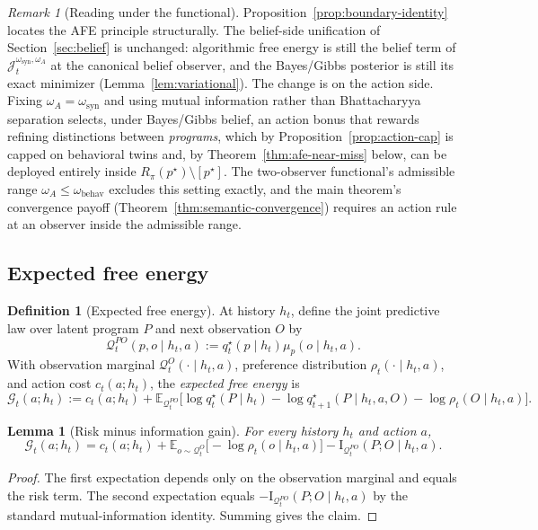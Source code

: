 \documentclass[11pt]{article}
\newtheorem{lemma}[theorem]{Lemma}
\theoremstyle{definition}
\newtheorem{definition}[theorem]{Definition}
\theoremstyle{remark}
\newtheorem{remark}[theorem]{Remark}
\newcommand{\Gcal}{\mathcal{G}}
\newcommand{\Qcal}{\mathcal{Q}}
\newcommand{\E}{\mathbb{E}}
\newcommand{\I}{\mathrm{I}}
\begin{document}
\begin{remark}[Reading under the functional]
\label{rem:boundary-identity}
Proposition~\ref{prop:boundary-identity} locates the AFE principle structurally. The belief-side unification of Section~\ref{sec:belief} is unchanged: algorithmic free energy is still the belief term of $\mathcal J_t^{\omega_{\mathrm{syn}},\omega_A}$ at the canonical belief observer, and the Bayes/Gibbs posterior is still its exact minimizer (Lemma~\ref{lem:variational}). The change is on the action side. Fixing $\omega_A=\omega_{\mathrm{syn}}$ and using mutual information rather than Bhattacharyya separation selects, under Bayes/Gibbs belief, an action bonus that rewards refining distinctions between \emph{programs}, which by Proposition~\ref{prop:action-cap} is capped on behavioral twins and, by Theorem~\ref{thm:afe-near-miss} below, can be deployed entirely inside $R_\pi(p^\star)\setminus[p^\star]$. The two-observer functional's admissible range $\omega_A\le\omega_{\mathrm{behav}}$ excludes this setting exactly, and the main theorem's convergence payoff (Theorem~\ref{thm:semantic-convergence}) requires an action rule at an observer inside the admissible range.
\end{remark}

\subsection{Expected free energy}

\begin{definition}[Expected free energy]
\label{def:efe}
At history $h_t$, define the joint predictive law over latent program $P$ and next observation $O$ by
\[
\Qcal_t^{PO}(p,o\mid h_t,a):=q_t^\star(p\mid h_t)\mu_p(o\mid h_t,a).
\]
With observation marginal $\Qcal_t^O(\cdot\mid h_t,a)$, preference distribution $\rho_t(\cdot\mid h_t,a)$, and action cost $c_t(a;h_t)$, the \emph{expected free energy} is
\[
\Gcal_t(a;h_t)
:=
c_t(a;h_t)
+
\E_{\Qcal_t^{PO}}\!\bigl[\log q_t^\star(P\mid h_t)-\log q_{t+1}^\star(P\mid h_t,a,O)-\log\rho_t(O\mid h_t,a)\bigr].
\]
\end{definition}

\begin{lemma}[Risk minus information gain]
\label{lem:risk-ig}
For every history $h_t$ and action $a$,
\[
\Gcal_t(a;h_t)
=
c_t(a;h_t)
+\E_{o\sim\Qcal_t^O}\bigl[-\log\rho_t(o\mid h_t,a)\bigr]
-\I_{\Qcal_t^{PO}}(P;O\mid h_t,a).
\]
\end{lemma}

\begin{proof}
The first expectation depends only on the observation marginal and equals the risk term. The second expectation equals $-\I_{\Qcal_t^{PO}}(P;O\mid h_t,a)$ by the standard mutual-information identity. Summing gives the claim.
\end{proof}
\end{document}
